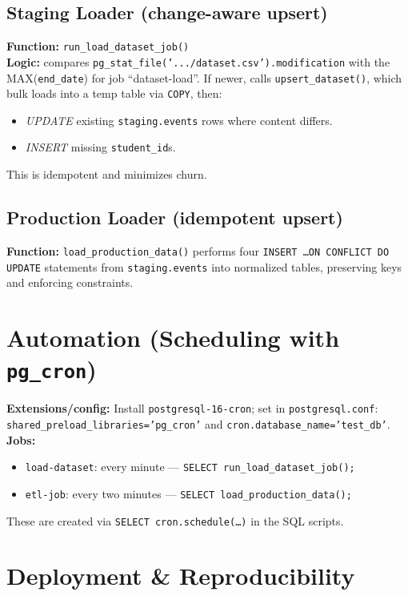 \documentclass[11pt]{article}
\begin{document}
\subsection*{Staging Loader (change-aware upsert)}
\textbf{Function:} \texttt{run\_load\_dataset\_job()}\\
\textbf{Logic:} compares \texttt{pg\_stat\_file('.../dataset.csv').modification} with the MAX(\texttt{end\_date}) for job ``dataset-load''. If newer, calls \texttt{upsert\_dataset()}, which bulk loads into a temp table via \texttt{COPY}, then:
\begin{itemize}[leftmargin=1.2em]
  \item \emph{UPDATE} existing \texttt{staging.events} rows where content differs.
  \item \emph{INSERT} missing \texttt{student\_id}s.
\end{itemize}
This is idempotent and minimizes churn.

\subsection*{Production Loader (idempotent upsert)}
\textbf{Function:} \texttt{load\_production\_data()} performs four \texttt{INSERT \ldots ON CONFLICT DO UPDATE} statements from \texttt{staging.events} into normalized tables, preserving keys and enforcing constraints.

\section{Automation (Scheduling with \texttt{pg\_cron})}
\textbf{Extensions/config:} Install \texttt{postgresql-16-cron}; set in \texttt{postgresql.conf}:\\
\texttt{shared\_preload\_libraries='pg\_cron'} and \texttt{cron.database\_name='test\_db'}.\\
\textbf{Jobs:}
\begin{itemize}[leftmargin=1.2em]
  \item \texttt{load-dataset}: every minute — \texttt{SELECT run\_load\_dataset\_job();}
  \item \texttt{etl-job}: every two minutes — \texttt{SELECT load\_production\_data();}
\end{itemize}
These are created via \texttt{SELECT cron.schedule(\ldots)} in the SQL scripts.

\section{Deployment \& Reproducibility}
\end{document}
